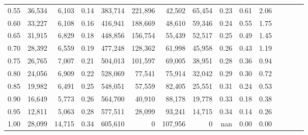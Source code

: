 \begin{tabular}{rrrcrrrrrrrrrrr}
0.55 &  36,534 &   6,103 &                                       0.14 &  383,714 &  221,896 &   42,502 &   65,454 &  0.23 &  0.61 &                         2.06 \\
0.60 &  33,227 &   6,108 &                                       0.16 &  416,941 &  188,669 &   48,610 &   59,346 &  0.24 &  0.55 &                         1.75 \\
0.65 &  31,915 &   6,829 &                                       0.18 &  448,856 &  156,754 &   55,439 &   52,517 &  0.25 &  0.49 &                         1.45 \\
0.70 &  28,392 &   6,559 &                                       0.19 &  477,248 &  128,362 &   61,998 &   45,958 &  0.26 &  0.43 &                         1.19 \\
0.75 &  26,765 &   7,007 &                                       0.21 &  504,013 &  101,597 &   69,005 &   38,951 &  0.28 &  0.36 &                         0.94 \\
0.80 &  24,056 &   6,909 &                                       0.22 &  528,069 &   77,541 &   75,914 &   32,042 &  0.29 &  0.30 &                         0.72 \\
0.85 &  19,982 &   6,491 &                                       0.25 &  548,051 &   57,559 &   82,405 &   25,551 &  0.31 &  0.24 &                         0.53 \\
0.90 &  16,649 &   5,773 &                                       0.26 &  564,700 &   40,910 &   88,178 &   19,778 &  0.33 &  0.18 &                         0.38 \\
0.95 &  12,811 &   5,063 &                                       0.28 &  577,511 &   28,099 &   93,241 &   14,715 &  0.34 &  0.14 &                         0.26 \\
1.00 &  28,099 &  14,715 &                                       0.34 &  605,610 &        0 &  107,956 &        0 &   nan &  0.00 &                         0.00 \\
\bottomrule
\end{tabular}
